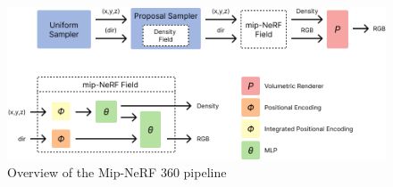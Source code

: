 \begin{figure}[!h]
    \centering
    \includegraphics[width=1.0\textwidth]{figures/mip-nerf-360-pipeline-overview.png}
    \caption{Overview of the Mip-NeRF 360 pipeline}
    \label{fig:mip-nerf-360-pipeline-overview}
\end{figure}